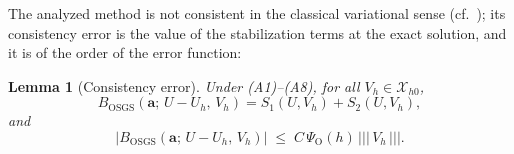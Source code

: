 \documentclass[11pt]{article}
\newtheorem{lemma}[theorem]{Lemma}
\theoremstyle{remark}
\newcommand{\ba}{\boldsymbol{a}}
\newcommand{\tnorm}[1]{\lvert\!\lvert\!\lvert\, #1 \,\rvert\!\rvert\!\rvert}
\newcommand{\Xhz}{\mathcal{X}_{h0}}
\begin{document}
The analyzed method is not consistent in the classical variational sense
(cf.~\cite[Eq.~(44)]{Codina2008}); its consistency error is the value of the
stabilization terms at the exact solution, and it is of the order of the error
function:

\begin{lemma}[Consistency error]
\label{lem:consistency}
Under \textup{(A1)--(A8)}, for all $V_h \in \Xhz$,
\begin{equation}
  \label{eq:ConsistencyId}
  B_{\mathrm{OSGS}}(\ba;\, U - U_h,\, V_h)
  = S_1(U, V_h) + S_2(U, V_h),
\end{equation}
and
\begin{equation}
  \label{eq:ConsistencyBound}
  \bigl| B_{\mathrm{OSGS}}(\ba;\, U - U_h,\, V_h) \bigr|
  \;\le\; C\,\Psi_{\mathrm O}(h)\,\tnorm{V_h}.
\end{equation}
\end{lemma}
\end{document}
